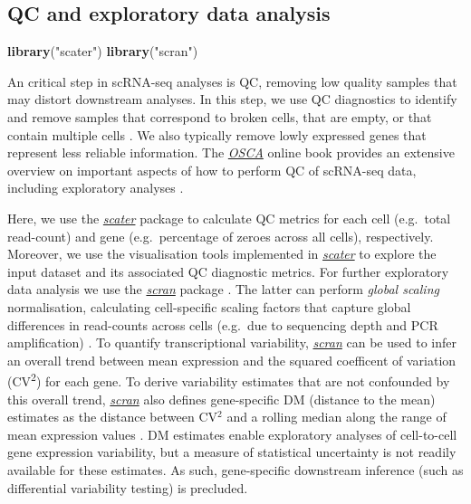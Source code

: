 \documentclass[9pt,a4paper,]{extarticle}
\newenvironment{Shaded}{\begin{snugshade}}{\end{snugshade}}
\newcommand{\KeywordTok}[1]{\textcolor[rgb]{0.13,0.29,0.53}{\textbf{#1}}}
\newcommand{\NormalTok}[1]{#1}
\newcommand{\StringTok}[1]{\textcolor[rgb]{0.31,0.60,0.02}{#1}}
\begin{document}
\hypertarget{qc-and-exploratory-data-analysis}{%
\subsection{QC and exploratory data analysis}\label{qc-and-exploratory-data-analysis}}

\begin{Shaded}
\begin{Highlighting}[]
\KeywordTok{library}\NormalTok{(}\StringTok{"scater"}\NormalTok{)}
\KeywordTok{library}\NormalTok{(}\StringTok{"scran"}\NormalTok{)}
\end{Highlighting}
\end{Shaded}

An critical step in scRNA-seq analyses is QC, removing low quality samples that
may distort downstream analyses.
In this step, we use QC diagnostics to identify and remove samples that
correspond to broken cells, that are empty, or that contain multiple cells
\citep{Ilicic2016}. We also typically remove lowly expressed genes that represent
less reliable information.
The \href{https://osca.bioconductor.org/}{\emph{OSCA}} online book provides an extensive
overview on important aspects of how to perform QC of scRNA-seq data, including
exploratory analyses \citep{Amezquita2019}.

Here, we use the \emph{\href{https://bioconductor.org/packages/3.11/scater}{scater}} package \citep{McCarthy2017} to calculate
QC metrics for each cell (e.g.~total read-count) and gene (e.g.~percentage of
zeroes across all cells), respectively.
Moreover, we use the visualisation tools implemented in \emph{\href{https://bioconductor.org/packages/3.11/scater}{scater}} to
explore the input dataset and its associated QC diagnostic metrics.
For further exploratory data analysis we use the \emph{\href{https://bioconductor.org/packages/3.11/scran}{scran}} package
\citep{Lun2016}.
The latter can perform \emph{global scaling} normalisation, calculating
cell-specific scaling factors that capture global differences in read-counts
across cells (e.g.~due to sequencing depth and PCR amplification)
\citep{Lun2016pooling}.
To quantify transcriptional variability, \emph{\href{https://bioconductor.org/packages/3.11/scran}{scran}} can be used to
infer an overall trend between mean expression and the squared coefficent of
variation (CV\textsuperscript{2}) for each gene.
To derive variability estimates that are not confounded by this overall trend,
\emph{\href{https://bioconductor.org/packages/3.11/scran}{scran}} also defines gene-specific DM (distance to the mean)
estimates as the distance between CV\(^2\) and a rolling median along the range
of mean expression values \citep{Kolodziejczyk2015cell}.
DM estimates enable exploratory analyses of cell-to-cell gene expression
variability, but a measure of statistical uncertainty is not readily available
for these estimates.
As such, gene-specific downstream inference (such as differential variability
testing) is precluded.
\end{document}

